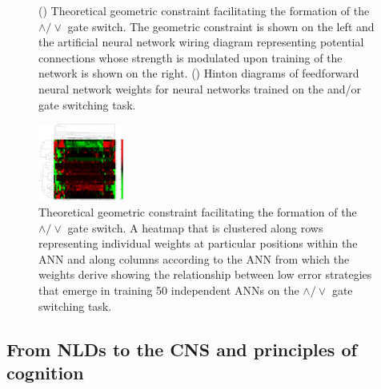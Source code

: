 \begin{figure}
\begin{center}
\begin{subfigure}[b]{0.45\linewidth}
\begin{center}
\begin{tabular}{cccc}
\end{tabular}
\end{center}
\caption{}\label{fig:hintDiag}
\end{subfigure}
\end{center}
\caption{() Theoretical geometric constraint facilitating the formation of the $\wedge / \vee$ gate switch. The geometric constraint is shown on the left and the artificial neural network wiring diagram representing potential connections whose strength is modulated upon training of the network is shown on the right. () Hinton diagrams of feedforward neural network weights for neural networks trained on the and/or gate switching task.}\label{fig:neuralnets}
\end{figure}

\begin{figure}
\begin{center}
\includegraphics[width=0.25\textwidth]{../fig/dendrogram.pdf}
\end{center}
\caption{Theoretical geometric constraint facilitating the formation of the $\wedge / \vee$ gate switch. A heatmap that is clustered along rows representing individual weights at particular positions within the ANN and along columns according to the ANN from which the weights derive showing the relationship between low error strategies that emerge in training 50 independent ANNs on the $\wedge / \vee$ gate switching task.}\label{fig:nnDendro}
\end{figure}

\subsection{From NLDs to the CNS and principles of cognition}

